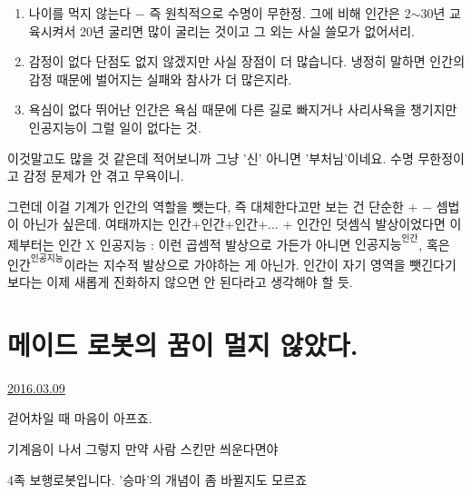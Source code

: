 \vspace{5mm}
\begin{enumerate}
    \item 나이를 먹지 않는다 $-$ 즉 원칙적으로 수명이 무한정.
    그에 비해 인간은 2$\sim$30년 교육시켜서 20년 굴리면 많이 굴리는 것이고 그 외는 사실 쓸모가 없어서리.
    \vspace{5mm}
    
    \item 감정이 없다
    단점도 없지 않겠지만 사실 장점이 더 많습니다. 냉정히 말하면 인간의 감정 때문에 벌어지는 실패와 참사가 더 많은지라.
    \vspace{5mm}
    
    \item 욕심이 없다
    뛰어난 인간은 욕심 때문에 다른 길로 빠지거나 사리사욕을 챙기지만 인공지능이 그럴 일이 없다는 것.
\end{enumerate}
\vspace{5mm}

이것말고도 많을 것 같은데 적어보니까 그냥 '신' 아니면 '부처님'이네요.
수명 무한정이고 감정 문제가 안 겪고 무욕이니.
\vspace{5mm}

그런데 이걸 기계가 인간의 역할을 뺏는다, 즉 대체한다고만 보는 건 단순한 + $-$ 셈법이 아닌가 싶은데.
여태까지는 인간+인간+인간+... + 인간인 덧셈식 발상이었다면
이제부터는 인간 X 인공지능 : 이런 곱셈적 발상으로 가든가 아니면 $\textrm{인공지능}^\textrm{인간}$, 혹은 $\textrm{인간}^{인공지능}$이라는 지수적 발상으로 가야하는 게 아닌가.
인간이 자기 영역을 뺏긴다기보다는 이제 새롭게 진화하지 않으면 안 된다라고 생각해야 할 듯.
\vspace{5mm}






\section{메이드 로봇의 꿈이 멀지 않았다.}
\href{https://www.kockoc.com/Apoc/670931}{2016.03.09}

\vspace{5mm}

걷어차일 때 마음이 아프죠.
\vspace{5mm}

기계음이 나서 그렇지 만약 사람 스킨만 씌운다면야
\vspace{5mm}

4족 보행로봇입니다. '승마'의 개념이 좀 바뀔지도 모르죠
\vspace{5mm}

